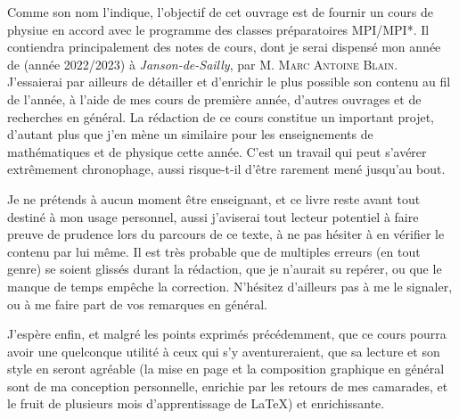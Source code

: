 \documentclass[a4paper,french,bookmarks]{book}
\begin{document}
    \newline\newline\newline
    
    \begin{center}
        \begin{minipage}{0.85\linewidth}
            \large \qquad Comme son nom l'indique, l'objectif de cet ouvrage est de fournir un cours de physiue en accord avec le programme des classes préparatoires \textsf{MPI/MPI*}. Il contiendra principalement des notes de cours, dont je serai dispensé mon année de  (année 2022/2023) à \textit{Janson-de-Sailly}, par M. \textsc{Marc Antoine Blain}. J'essaierai par ailleurs de détailler et d'enrichir le plus possible son contenu au fil de l'année, à l'aide de mes cours de première année, d'autres ouvrages et de recherches en général. La rédaction de ce cours constitue un important projet, d'autant plus que j'en mène un similaire pour les enseignements de mathématiques et de physique cette année. C'est un travail qui peut s'avérer extrêmement chronophage, aussi risque-t-il d'être rarement mené jusqu'au bout.\newline
    
            \qquad Je ne prétends à aucun moment être enseignant, et ce livre reste avant tout destiné à mon usage personnel, aussi j'aviserai tout lecteur potentiel à faire preuve de prudence lors du parcours de ce texte, à ne pas hésiter à en vérifier le contenu par lui même. Il est très probable que de multiples erreurs (en tout genre) se soient glissés durant la rédaction, que je n'aurait su repérer, ou que le manque de temps empêche la correction. N'hésitez d'ailleurs pas à me le signaler, ou à me faire part de vos remarques en général.\newline
    
            \qquad J'espère enfin, et malgré les points exprimés précédemment, que ce cours pourra avoir une quelconque utilité à ceux qui s'y aventureraient, que sa lecture et son style en seront agréable (la mise en page et la composition graphique en général sont de ma conception personnelle, enrichie par les retours de mes camarades, et le fruit de plusieurs mois d'apprentissage de \LaTeX) et enrichissante.\newline\newline\newline\text{}
        \end{minipage}
    \end{center}
    
\end{document}
